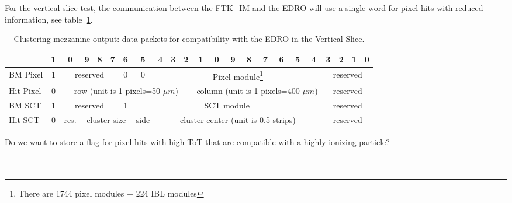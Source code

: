 \documentclass[10pt]{article}
\numberwithin{figure}{section}
\numberwithin{equation}{section}
\numberwithin{table}{section}
\newcommand{\0}{\phantom{0}}
\begin{document}
For the vertical slice test, the communication between the FTK\_IM and the EDRO will use a single word for pixel hits with reduced information, see table~\ref{tab:FTK_IM_OUT_dataEDRO}.
\begin{table}[h]
\begin{tabular}{l|c|c|c|c|c|c|c|c|c|c|c|c|c|c|c|c|c|c|c|c|c|c|}
& 1 & 0 &  9 & 8 & 7 & 6 & 5 & 4 & 3 & 2 & 1 & 0 & 9 & 8 & 7 & 6 & 5 & 4 & 3 & 2 & 1 & 0 \\ \hline

BM Pixel & 1 & \multicolumn{4}{c|}{reserved} & 0 & 0 &
               \multicolumn{11}{c|}{Pixel module\footnote{There are 1744 pixel modules + 224 IBL modules} } & \multicolumn{4}{c|}{reserved} \\\hline
Hit Pixel& 0 & \multicolumn{9}{c|}{row (unit is 1 pixels=50 $\mu m$) } &
                       \multicolumn{8}{c|}{column (unit is 1 pixels=400 $\mu m$) } & \multicolumn{4}{c|}{reserved} \\\hline
BM SCT &1 & \multicolumn{4}{c|}{reserved} & 1 &
               \multicolumn{12}{c|}{SCT module} & \multicolumn{4}{c|}{reserved} \\\hline
Hit SCT & 0 & res. & \multicolumn{4}{c|}{cluster size} &
                 \multicolumn{1}{c|}{side} &
                 \multicolumn{11}{c|}{ cluster center (unit is 0.5 strips)} & \multicolumn{4}{c|}{reserved} \\\hline
\end{tabular}
\caption{\label{tab:FTK_IM_OUT_dataEDRO}Clustering mezzanine output: data packets for compatibility with the EDRO in the Vertical Slice.}
\end{table}


Do we want to store a flag for pixel hits with high ToT that are compatible with a highly ionizing particle? \\
\\
\\
\end{document}
